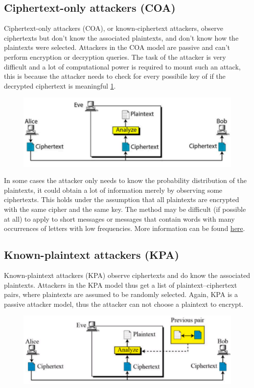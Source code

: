 	\subsection{Ciphertext-only attackers (COA)}
	Ciphertext-only attackers (COA), or known-ciphertext attackers, observe ciphertexts but don’t know the 	associated plaintexts, and don’t know how the plaintexts were selected. Attackers in the COA model are passive and can’t perform encryption or decryption queries. The task of the attacker is very difficult and a lot of computational power is required to mount such an attack, this is because the attacker needs to check for every possibile key of if the decrypted ciphertext is meaningful \ref{fig:coa}.
	\begin{figure}
		\centering
		\includegraphics[width=0.7\linewidth]{Images/Chapter1/coa}
		\caption{}
		\label{fig:coa}
	\end{figure}
	
	In some cases the attacker only needs to know the probability distribution of the plaintexts, it could obtain a lot of information merely by observing some ciphertexts. This holds under the assumption that all plaintexts are encrypted with the same cipher and the same key. The method may be difficult (if possible at all) to apply to short messages or messages that contain words with many occurrences of letters with low frequencies. More information can be found \href{https://crypto.interactive-maths.com/frequency-analysis-breaking-the-code.html}{here}.


	\subsection{Known-plaintext attackers (KPA)}
	Known-plaintext attackers (KPA) observe ciphertexts and do know the associated plaintexts. Attackers in the KPA model thus get a list of plaintext–ciphertext pairs, where plaintexts are assumed to be randomly selected. Again, KPA is a passive attacker model, thus the attacker can not choose a plaintext to encrypt.
	\begin{figure}
		\centering
		\includegraphics[width=0.7\linewidth]{Images/Chapter1/kpa}
		\caption{}
		\label{fig:kpa}
	\end{figure}
	
